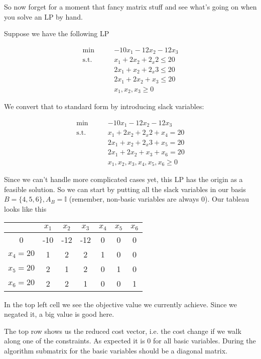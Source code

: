 \begin{Ex} So now forget for a moment that fancy matrix stuff and see what's going on when you solve an LP by hand.

Suppose we have the following LP

\begin{align*}
\min \qquad& -10x_1 -12x_2 -12x_3\\
\text{s.t.}\qquad & x_1+2x_2 +2_x2\leq 20\\
&2x_1 +x_2+2_x3\leq 20\\
& 2x_1+2x_2 +x_3\leq 20\\
& x_1,x_2,x_3 \geq 0
\end{align*}

We convert that to standard form by introducing slack variables:

\begin{align*}
\min \qquad & -10x_1 -12x_2 -12x_3\\
\text{s.t.}\qquad & x_1+2x_2 +2_x2 + x_4 = 20\\
&2x_1 +x_2+2_x3 +x_5 =20\\
& 2x_1+2x_2 +x_3 +x_6 = 20\\
& x_1,x_2,x_3,x_4,x_5,x_6 \geq 0
\end{align*}

Since we can't handle more complicated cases yet, this LP has the origin as a feasible solution. So we can start by putting all the slack variables in our basis $B=\{4,5,6\}, A_B=\mathbb{I}$ (remember, non-basic variables are always 0). Our tableau looks like this

\begin{center}
\begin{tabular}{c|cccccc}
  & $x_1$ & $x_2$ & $x_3$ & $x_4$ & $x_5$ & $x_6$ \\\hline
0 & -10 & -12 & -12 & 0 & 0 & 0\\
$x_4=20$ & 1 & 2 & 2 & 1 &  0 & 0 \\
$x_5=20$ & 2 & 1 & 2 & 0 &  1 & 0\\
$x_6=20$ & 2 & 2 & 1 & 0 &  0 & 1\\
\end{tabular}
\end{center}

In the top left cell we see the objective value we currently achieve. Since we negated it, a big value is good here.

The top row shows us the reduced cost vector, i.e. the cost change if we walk along one of the constraints. As expected it is 0 for all basic variables. During the algorithm submatrix for the basic variables should be a diagonal matrix. 


\end{Ex}
